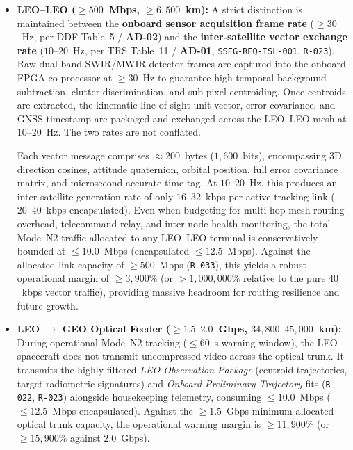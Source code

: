 \begin{itemize}
    \item \textbf{LEO--LEO  ($\ge 500$~Mbps, $\ge 6{,}500$~km):} 
    A strict distinction is maintained between the \textbf{onboard sensor acquisition frame rate} ($\ge 30$~Hz, per DDF Table~5 / \textbf{AD-02}) and the \textbf{inter-satellite  vector exchange rate} ($10\text{--}20$~Hz, per TRS Table~11 / \textbf{AD-01}, \texttt{SSEG-REQ-ISL-001}, \texttt{R-023}). Raw dual-band SWIR/MWIR detector frames are captured into the onboard FPGA co-processor at $\ge 30$~Hz to guarantee high-temporal background subtraction, clutter discrimination, and sub-pixel centroiding. Once centroids are extracted, the kinematic line-of-sight unit vector, error covariance, and GNSS timestamp are packaged and exchanged across the LEO--LEO  mesh at $10\text{--}20$~Hz. The two rates are not conflated.
    
    Each  vector message comprises $\approx 200$~bytes ($1{,}600$~bits), encompassing 3D direction cosines, attitude quaternion, orbital position, full error covariance matrix, and microsecond-accurate time tag. At $10\text{--}20$~Hz, this produces an inter-satellite generation rate of only $16\text{--}32$~kbps per active tracking link ($20\text{--}40$~kbps encapsulated). Even when budgeting for multi-hop mesh routing overhead, telecommand relay, and inter-node health monitoring, the total Mode~N2 traffic allocated to any LEO--LEO  terminal is conservatively bounded at $\le 10.0$~Mbps (encapsulated $\le 12.5$~Mbps). Against the allocated link capacity of $\ge 500$~Mbps (\texttt{R-033}), this yields a robust operational margin of $\ge 3{,}900\%$ (or $> 1{,}000{,}000\%$ relative to the pure $40$~kbps  vector traffic), providing massive headroom for routing resilience and future growth.
    
    \item \textbf{LEO $\rightarrow$ GEO Optical Feeder ($\ge 1.5\text{--}2.0$~Gbps, $34{,}800\text{--}45{,}000$~km):} 
    During operational Mode~N2 tracking ($\le 60$~s warning window), the LEO spacecraft does not transmit uncompressed video across the optical trunk. It transmits the highly filtered \emph{LEO Observation Package} (centroid trajectories, target radiometric signatures) and \emph{Onboard Preliminary Trajectory} fits (\texttt{R-022}, \texttt{R-023}) alongside housekeeping telemetry, consuming $\le 10.0$~Mbps ($\le 12.5$~Mbps encapsulated). Against the $\ge 1.5$~Gbps minimum allocated optical trunk capacity, the operational warning margin is $\ge 11{,}900\%$ (or $\ge 15{,}900\%$ against $2.0$~Gbps).
    

\end{itemize}
